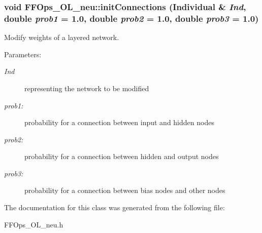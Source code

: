 \subsubsection{\setlength{\rightskip}{0pt plus 5cm}void FFOps\_\-OL\_\-neu::init\-Connections (Individual \& {\em Ind}, double {\em prob1} = 1.0, double {\em prob2} = 1.0, double {\em prob3} = 1.0)}\label{classFFOps__OL__neu_a0}


Modify weights of a layered network.

\begin{Desc}
\item[Parameters: ]\par
\begin{description}
\item[{\em 
Ind}]representing the network to be modified \item[{\em 
prob1:}]probability for a connection between input and hidden nodes \item[{\em 
prob2:}]probability for a connection between hidden and output nodes \item[{\em 
prob3:}]probability for a connection between bias nodes and other nodes \end{description}
\end{Desc}


The documentation for this class was generated from the following file:\begin{CompactItemize}
\item 
FFOps\_\-OL\_\-neu.h\end{CompactItemize}
